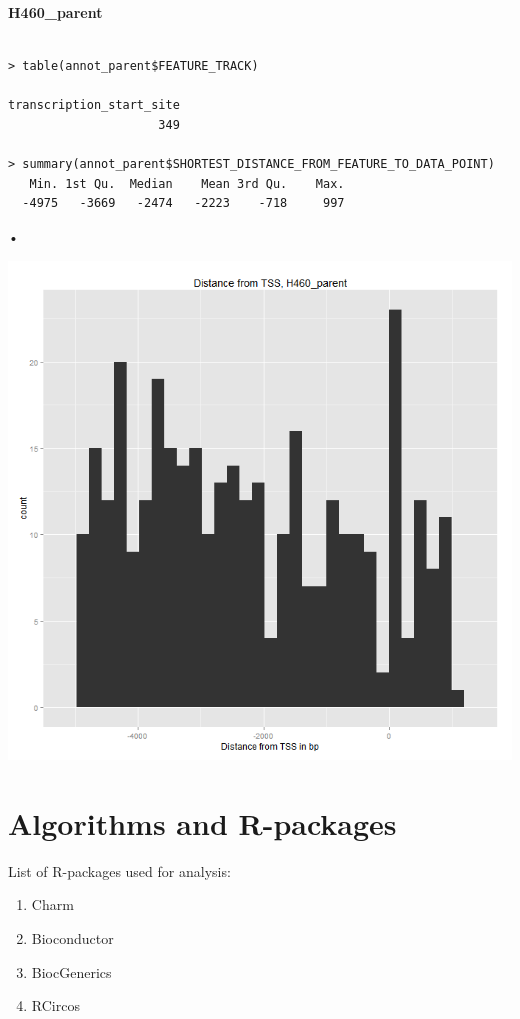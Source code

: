 \documentclass[11pt]{article}
\begin{document}
{\bf H460\_parent}

\begin{verbatim}

> table(annot_parent$FEATURE_TRACK)

transcription_start_site 
                     349 

> summary(annot_parent$SHORTEST_DISTANCE_FROM_FEATURE_TO_DATA_POINT)
   Min. 1st Qu.  Median    Mean 3rd Qu.    Max. 
  -4975   -3669   -2474   -2223    -718     997 

\end{verbatim}•

\includegraphics[scale=0.5]{distribution_parent.png}


\section*{Algorithms and R-packages}

List of R-packages used for analysis:
\begin{enumerate}

\item Charm

\item Bioconductor

\item BiocGenerics

\item RCircos

\end{enumerate}
\end{document}
